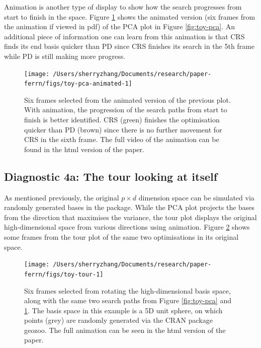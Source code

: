 Animation is another type of display to show how the search progresses
from start to finish in the space. Figure \ref{fig:toy-pca-animated}
shows the animated version (six frames from the animation if viewed in
pdf) of the PCA plot in Figure \ref{fig:toy-pca}. An additional piece of
information one can learn from this animation is that CRS finds its end
basis quicker than PD since CRS finishes its search in the 5th frame
while PD is still making more progress.

\begin{Schunk}
\begin{figure}

{\centering \texttt{[image: /Users/sherryzhang/Documents/research/paper-ferrn/figs/toy-pca-animated-1]} 

}

\caption[Six frames selected from the animated version of the previous plot]{Six frames selected from the animated version of the previous plot. With animation, the progression of the search paths from start to finish is better identified. CRS (green) finishes the optimisation quicker than PD (brown) since there is no further movement for CRS in the sixth frame. The full video of the animation can be found in the html version of the paper.}\label{fig:toy-pca-animated}
\end{figure}
\end{Schunk}

\hypertarget{diagnostic-4a-the-tour-looking-at-itself}{%
\subsection{Diagnostic 4a: The tour looking at
itself}\label{diagnostic-4a-the-tour-looking-at-itself}}

As mentioned previously, the original \(p \times d\) dimension space can
be simulated via randomly generated bases in the 
\citep{geozoo} package. While the PCA plot projects the bases from the
direction that maximises the variance, the tour plot displays the
original high-dimensional space from various directions using animation.
Figure \ref{fig:toy-tour} shows some frames from the tour plot of the
same two optimisations in its original space.

\begin{Schunk}
\begin{figure}

{\centering \texttt{[image: /Users/sherryzhang/Documents/research/paper-ferrn/figs/toy-tour-1]} 

}

\caption{Six frames selected from rotating the high-dimensional basis space, along with the same two search paths from Figure \ref{fig:toy-pca} and \ref{fig:toy-pca-animated}. The basis space in this example is a 5D unit sphere, on which points (grey) are randomly generated via the CRAN package geozoo. The full animation can be seen in the html version of the paper.}\label{fig:toy-tour}
\end{figure}
\end{Schunk}

